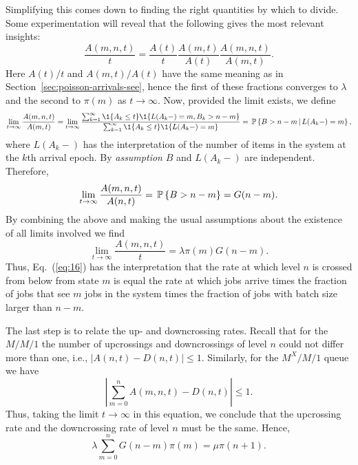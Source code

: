 Simplifying this comes down to finding the right quantities by which
to divide. Some experimentation will reveal that the following gives
the most relevant insights:
\begin{equation}\label{eq:16}
  \frac{A(m,n,t)}t =   \frac{A(t)}t \frac{A(m,t)}{A(t)}\frac{A(m,n,t)}{A(m,t)}.
\end{equation}
Here $A(t)/t$ and $A(m,t)/A(t)$ have the same meaning as in
Section~\ref{sec:poisson-arrivals-see}, hence the first of these
fractions converges to $\lambda$ and the second to $\pi(m)$ as
$t\to\infty$. Now, provided the limit exists, we define
\begin{equation*}
\lim_{t\to\infty} \frac{A(m,n,t)}{A(m,t)} = 
\lim_{t\to\infty} \frac{\sum_{k=1}^\infty \1{A_k \leq t}\1{L(A_k-) = m, B_k > n-m}}
{\sum_{k=1}^\infty \1{A_k \leq t}\1{L(A_k-) = m}}=\P{B>n-m\given L(A_k-)=m},
\end{equation*}
where $L(A_k-)$ has the interpretation of the number of items in the
system at the $k$th arrival epoch.  By \emph{assumption} $B$ and $L(A_k-)$ are
independent. Therefore,
\begin{equation*}
\lim_{t\to\infty} \frac{A(m,n,t)}{A(n,t)} = \P{B>n-m} = G(n-m).
\end{equation*} 
By combining the above and making the usual assumptions about the
existence of all limits involved we find
\begin{equation*}
\lim_{t\to\infty}   \frac{A(m,n,t)}t = \lambda \pi(m) G(n-m).
\end{equation*}
Thus, Eq.~(\ref{eq:16}) has the interpretation that the rate at which
level $n$ is crossed from below from state $m$ is equal the rate at
which jobs arrive times the fraction of jobs that see $m$ jobs in the
system times the fraction of jobs with batch size larger than $n-m$. 


The last step is to relate the up- and downcrossing rates.  Recall
that for the $M/M/1$ the number of upcrossings and downcrossings of
level $n$ could not differ more than one, i.e.,
$|A(n,t)-D(n,t)|\leq 1$. Similarly, for the $M^X/M/1$ queue we have
 \begin{equation}\label{eq:53}
 \left|  \sum_{m=0}^n A(m,n,t) - D(n,t) \right|\leq1.
\end{equation}
Thus, taking the limit $t\to\infty$ in this equation, we conclude that
the upcrossing rate and the downcrossing rate of level $n$ must be the
same. Hence,
\begin{equation}\label{eq:42}
\lambda  \sum_{m=0}^n G(n-m) \pi(m) = \mu \pi(n+1).
\end{equation}


